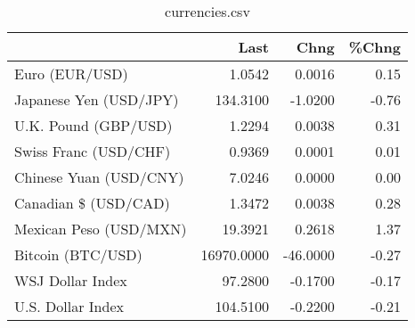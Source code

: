 \documentclass{article}%
\begin{document}
%


\begin{table}[htbp]%
\caption{currencies.csv}%
\centering%
\begin{adjustbox}{width=1\textwidth}%
\begin{tabular}{lrrr}
\toprule
                       &       Last &     Chng &  \%Chng \\
\midrule
        Euro (EUR/USD) &     1.0542 &   0.0016 &   0.15 \\
Japanese Yen (USD/JPY) &   134.3100 &  -1.0200 &  -0.76 \\
  U.K. Pound (GBP/USD) &     1.2294 &   0.0038 &   0.31 \\
 Swiss Franc (USD/CHF) &     0.9369 &   0.0001 &   0.01 \\
Chinese Yuan (USD/CNY) &     7.0246 &   0.0000 &   0.00 \\
  Canadian \$ (USD/CAD) &     1.3472 &   0.0038 &   0.28 \\
Mexican Peso (USD/MXN) &    19.3921 &   0.2618 &   1.37 \\
     Bitcoin (BTC/USD) & 16970.0000 & -46.0000 &  -0.27 \\
      WSJ Dollar Index &    97.2800 &  -0.1700 &  -0.17 \\
     U.S. Dollar Index &   104.5100 &  -0.2200 &  -0.21 \\
\bottomrule
\end{tabular}
%
\end{adjustbox}%
\end{table}

%
\end{document}
